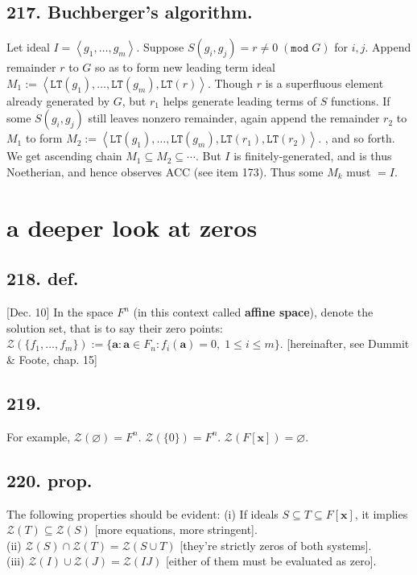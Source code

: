 \documentclass[12pt]{article}
\newcommand{\V}\mathbf%
\newcommand{\Ab}[1]{ \left\langle #1 \right\rangle } %
\newcommand{\SF}[1]{ \mathscr{#1} }%
\newcommand{\Ss}[1]{\textsf{\bfseries{#1}}}%
\newcommand{\Tw}[1]{\texttt{#1}}%
\newcommand{\Nl}{\\ \indent} %
\begin{document}
\subsection*{217. Buchberger's algorithm.} Let ideal \(I =\Ab{g_1,\dotsc,g_m}\). 
Suppose \(S(g_i,g_j) =r \neq 0\; (\Tw{mod}\; G)\) for \(i,j\). 
Append remainder \(r\) to \(G\) so as to form new leading term ideal \(M_1 := \Ab{\Tw{LT}(g_1),\dotsc,\Tw{LT}(g_m),\Tw{LT}(r)}\). 
Though \(r\) is a superfluous element already generated by \(G\), but \(r_1\) helps generate leading terms of \(S\) functions. 
If some \(S(g_i,g_j)\) still leaves nonzero remainder, again append the remainder \(r_2\) to \(M_1\) to form  \(M_2 := \Ab{\Tw{LT}(g_1),\dotsc,\Tw{LT}(g_m),\Tw{LT}(r_1),\Tw{LT}(r_2)}\). , and so forth. 
We get ascending chain \(M_1 \subseteq M_2 \subseteq\dotsb\). 
But \(I\) is finitely-generated, and is thus Noetherian, and hence observes ACC (see item 173). 
Thus some \(M_k\) must \(=I\). \par

\section{a deeper look at zeros}
\subsection*{218. def.} [Dec. 10] In the space \(F^n\) (in this context called \Ss{affine space}), denote the solution set, that is to say their zero points: \(\SF{Z}(\{f_1,\dotsc,f_m\}) := \{\V{a}: \V{a} \in F_n: f_i(\V{a}) =0,\; 1 \leq i \leq m\}\). [hereinafter, see Dummit \& Foote, chap. 15]

\subsection*{219.} For example, \(\SF{Z}(\varnothing) =F^n\). 
\(\SF{Z}(\{0\}) =F^n\). 
\(\SF{Z}(F[\V{x}]) =\varnothing\). 

\subsection*{220. prop.} The following properties should be evident: (i) If ideals \(S \subseteq T \subseteq F[\V{x}]\), it implies \(\SF{Z}(T) \subseteq \SF{Z}(S)\) [more equations, more stringent]. \Nl
(ii) \(\SF{Z}(S) \cap \SF{Z}(T) =\SF{Z}(S \cup T)\) [they're strictly zeros of both systems]. \Nl
(iii) \(\SF{Z}(I) \cup \SF{Z}(J) =\SF{Z}(IJ)\) [either of them must be evaluated as zero].
\end{document}

